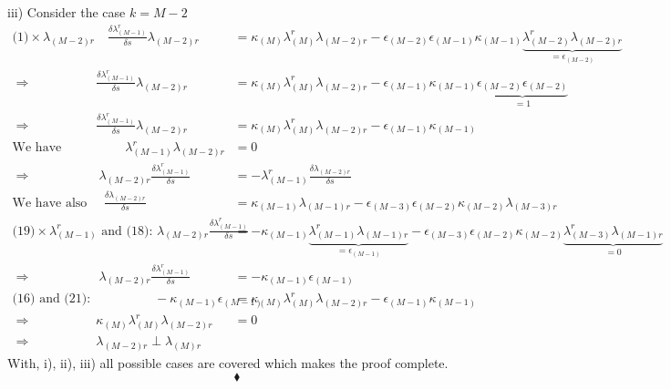 iii) Consider the case $k = M-2$\\\begin{align}
\text{(1)}\times \lambda_{(M-2)r}\quad \frac{\delta\lambda_{(M-1)}^r}{\delta s}\lambda_{(M-2)r} &= \kappa_{(M)}\lambda^r_{(M)}\lambda_{(M-2)r} - \epsilon_{(M-2)}\epsilon_{(M-1)}\kappa_{(M-1)}\underbrace{\lambda^r_{(M-2)}\lambda_{(M-2)r}}_{=\epsilon_{(M-2)}}\\
\Rightarrow \quad \quad\quad\quad\quad\frac{\delta\lambda_{(M-1)}^r}{\delta s}\lambda_{(M-2)r} &= \kappa_{(M)}\lambda^r_{(M)}\lambda_{(M-2)r} - \epsilon_{(M-1)}\kappa_{(M-1)}\underbrace{\epsilon_{(M-2)}\epsilon_{(M-2)}}_{=1}\\
\Rightarrow \quad \quad\quad\quad\quad\frac{\delta\lambda_{(M-1)}^r}{\delta s}\lambda_{(M-2)r} &= \kappa_{(M)}\lambda^r_{(M)}\lambda_{(M-2)r} - \epsilon_{(M-1)}\kappa_{(M-1)}\\
\text{We have}  \quad \quad\quad\quad\quad\lambda_{(M-1)}^r\lambda_{(M-2)r} &=0\\
\Rightarrow \quad \quad\quad\quad\quad\ \lambda_{(M-2)r}\frac{\delta\lambda_{(M-1)}^r}{\delta s} &= -\lambda_{(M-1)}^r\frac{\delta\lambda_{(M-2)r}}{\delta s}\\
\text{We have also }  \quad\frac{\delta\lambda_{(M-2)r}}{\delta s} &= \kappa_{(M-1)}\lambda_{(M-1)r} - \epsilon_{(M-3)}\epsilon_{(M-2)}\kappa_{(M-2)}\lambda_{(M-3)r}\\
\text{(19)}\times \lambda^r_{(M-1)} \text{ and (18): }  \lambda_{(M-2)r}\frac{\delta\lambda_{(M-1)}^r}{\delta s} &= -\kappa_{(M-1)}\underbrace{\lambda^r_{(M-1)}\lambda_{(M-1)r}}_{=\epsilon_{(M-1)}} - \epsilon_{(M-3)}\epsilon_{(M-2)}\kappa_{(M-2)}\underbrace{\lambda^r_{(M-3)}\lambda_{(M-1)r}}_{=0}\\
\Rightarrow \quad \quad\quad\quad\quad\ \lambda_{(M-2)r}\frac{\delta\lambda_{(M-1)}^r}{\delta s} &= -\kappa_{(M-1)}\epsilon_{(M-1)}\\
\text{(16) and (21):}\quad \quad\quad\quad\quad -\kappa_{(M-1)}\epsilon_{(M-1)} &= \kappa_{(M)}\lambda^r_{(M)}\lambda_{(M-2)r} - \epsilon_{(M-1)}\kappa_{(M-1)}\\
\Rightarrow \quad \quad\quad\quad\quad \kappa_{(M)}\lambda^r_{(M)}\lambda_{(M-2)r}&=0\\
\Rightarrow \quad \quad\quad\quad\quad \lambda_{(M-2)r}\perp\lambda_{(M)r}
\end{align}
With, i), ii), iii) all possible cases are covered which makes the proof complete.
$$\blacklozenge$$
\newpage

